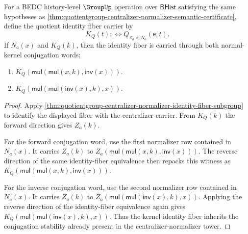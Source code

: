 \begin{theorem}
\label{thm:quotientgroup-centralizer-normalizer-identity-fiber-normal}
For a BEDC history-level $\GroupUp$ operation over $\mathsf{BHist}$ satisfying
the same hypotheses as
\autoref{thm:quotientgroup-centralizer-normalizer-semantic-certificate}, define
the quotient identity fiber carrier by
$$
K_Q(t) :\Longleftrightarrow Q_{Z_a\triangleleft N_a}(\mathsf{e},t).
$$
If $N_a(x)$ and $K_Q(k)$, then the identity fiber is carried through both
normal-kernel conjugation words:
\begin{enumerate}
\item $K_Q(\mathsf{mul}(\mathsf{mul}(x,k),\mathsf{inv}(x)))$.
\item $K_Q(\mathsf{mul}(\mathsf{mul}(\mathsf{inv}(x),k),x))$.
\end{enumerate}
\end{theorem}
\begin{proof}
Apply
\autoref{thm:quotientgroup-centralizer-normalizer-identity-fiber-subgroup}
to identify the displayed fiber with the centralizer carrier. From $K_Q(k)$
the forward direction gives $Z_a(k)$.

For the forward conjugation word, use the first normalizer row contained in
$N_a(x)$. It carries $Z_a(k)$ to
$Z_a(\mathsf{mul}(\mathsf{mul}(x,k),\mathsf{inv}(x)))$. The reverse direction
of the same identity-fiber equivalence then repacks this witness as
$K_Q(\mathsf{mul}(\mathsf{mul}(x,k),\mathsf{inv}(x)))$.

For the inverse conjugation word, use the second normalizer row contained in
$N_a(x)$. It carries $Z_a(k)$ to
$Z_a(\mathsf{mul}(\mathsf{mul}(\mathsf{inv}(x),k),x))$. Applying the reverse
direction of the identity-fiber equivalence again gives
$K_Q(\mathsf{mul}(\mathsf{mul}(\mathsf{inv}(x),k),x))$. Thus the kernel
identity fiber inherits the conjugation stability already present in the
centralizer-normalizer tower.
\end{proof}

